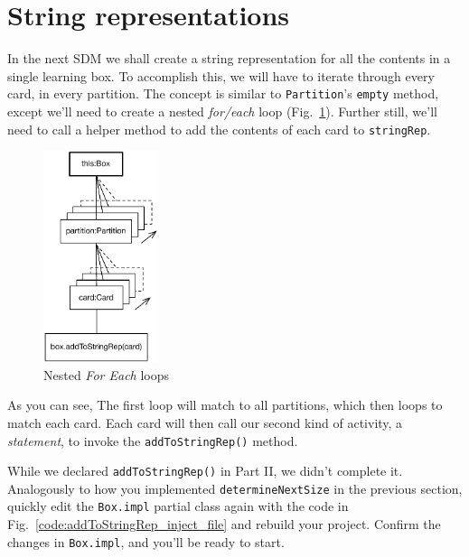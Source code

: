 \newpage
\hypertarget{sec:stringRep}{}
\section{String representations}
\genHeader

In the next SDM we shall create a string representation for all the contents in a single learning box. To accomplish this, we will have to iterate through 
every card, in every partition. The concept is similar to \texttt{Partition}'s \texttt{empty} method, except we'll need to create a nested \emph{for/each}
loop (Fig.~\ref{fig:goal_stringRep}). Further still, we'll need to call a helper method to add the contents of each card to \texttt{stringRep}.

\vspace{1cm}

\begin{figure}[htbp]
	\centering
	\includegraphics[width=0.3\textwidth]{goal_stringRep.pdf}
	\caption{Nested \emph{For Each} loops}
	\label{fig:goal_stringRep}
\end{figure}

\vspace{1cm}

As you can see, The first loop will match to all partitions, which then loops to match each card. Each card will then call our second kind of activity, a
\emph{statement}, to invoke the \texttt{addToStringRep()} method. 

\vspace{0.5cm}

While we declared \texttt{addToStringRep()} in Part II, we didn't complete it. Analogously to how you implemented \texttt{determineNextSize} in the
previous section, quickly edit the \texttt{Box.impl} partial class again with the code in Fig.~\ref{code:addToStringRep_inject_file} and rebuild your project.
Confirm the changes in \texttt{Box.impl}, and you'll be ready to start.

